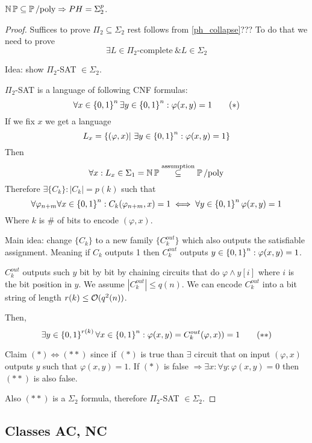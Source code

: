 \begin{theorem}
	$\operatorname{\operatorname{\mathbb{N}}\mathbb{P}} \subseteq \operatorname{\operatorname{\mathbb{P}}/poly} \Rightarrow PH = \Sigma_2^p$.
\end{theorem}
\begin{proof}
	Suffices to prove $\Pi_2 \subseteq \Sigma_2$ rest follows from \cref{ph_collapse}???
	To do that we need to prove
	\[\exists L \in \Pi_2\text{-complete}\ \& L \in \Sigma_2 \]

	Idea: show $\Pi_2$-SAT $\in \Sigma_2$.

	$\Pi_2$-SAT is a language of following CNF formulas:
	\begin{equation}
		\forall x \in \operatorname{\{ 0, 1 \}}^n \exists y \in \operatorname{\{ 0, 1 \}}^n: \varphi(x, y) = 1
		\tag{$*$}
	\end{equation}
	If we fix $x$ we get a language
	\[ L_x = \{ (\varphi, x) |\ \exists y \in \szo^n: \varphi(x, y) = 1 \} \]
	Then
	\[ \forall x: L_x \in \Sigma_1 = \operatorname{\operatorname{\mathbb{N}}\mathbb{P}} \stackrel{\text{assumption}}{\subseteq} \operatorname{\operatorname{\mathbb{P}}/poly} \]
	Therefore $\exists \{ C_k \}: |C_k| = p(k)$ such that
	\[ \forall \varphi_{n + m} \forall x \in \operatorname{\{ 0, 1 \}}^n: C_k(\varphi_{n + m}, x) = 1 \iff \forall y \in \operatorname{\{ 0, 1 \}}^n \varphi(x, y) = 1 \]
	Where $k$ is \# of bits to encode $(\varphi, x)$.

	Main idea: change $\{ C_k \}$ to a new family $\{ C_k^{out} \}$ which also outputs the satisfiable assignment.
	Meaning if $C_k$ outputs 1 then $C_k^{out}$ outputs $y \in \operatorname{\{ 0, 1 \}}^n: \varphi(x, y) = 1$.

	$C_k^{out}$ outputs such $y$ bit by bit by chaining circuits that do $\varphi \land y[i]$ where $i$ is the bit position in $y$.
	We assume $|C_k^{out}| \leq q(n)$.
	We can encode $C_k^{out}$ into a bit string of length $r(k) \leq \mathcal{O}(q^2(n))$.

	Then,
	\begin{equation}
		\exists y \in \operatorname{\{ 0, 1 \}}^{r(k)} \forall x \in \operatorname{\{ 0, 1 \}}^n: \varphi(x, y) = C_k^{out}(\varphi, x)) = 1
	\tag{$**$}
	\end{equation}

	Claim $(*) \iff (**)$ since if $(*)$ is true than $\exists$ circuit that on input $(\varphi, x)$ outputs $y$ such that $\varphi(x, y) = 1$.
	If $(*)$ is false $\Rightarrow \exists x: \forall y: \varphi(x, y) = 0$ then $(**)$ is also false.

	Also $(**)$ is a $\Sigma_2$ formula, therefore $\Pi_2$-SAT $\in \Sigma_2$.

\end{proof}

\subsection{Classes AC, NC}

